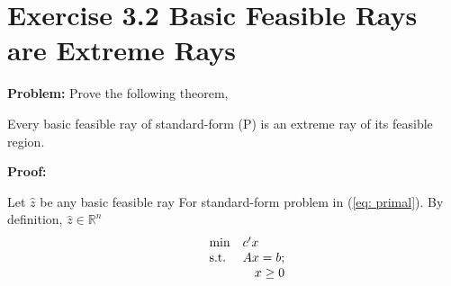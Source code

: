 \section{Exercise 3.2 Basic Feasible Rays are Extreme Rays}
\textbf{Problem: } Prove the following theorem,
\begin{thm}
Every basic feasible ray of standard-form (P) is an extreme ray of its feasible region.
\end{thm}

\textbf{Proof:}

Let $\widehat{z}$ be any basic feasible ray For standard-form problem in (\ref{eq: primal}). By definition, $\widehat{z}\in \mathbb{R}^{n}$
\begin{equation}
\label{eq: primal}
  \begin{array}{lrcll}
    \min
    & \multicolumn{4}{l}{c'x} \\
    \text{s.t.}
    & Ax=b;\\
    & x\geq0
  \end{array}
\end{equation}